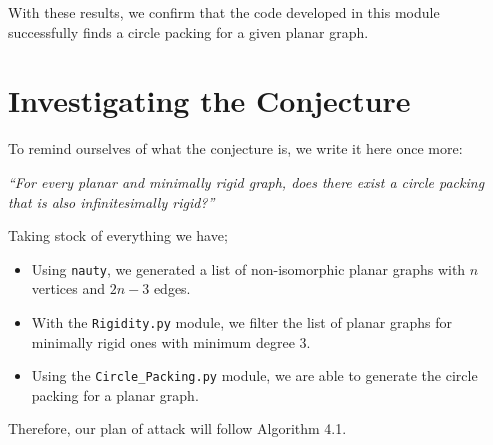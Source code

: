 \begin{flushleft}
With these results, we confirm that the code developed in this module successfully finds a circle packing for a given planar graph.
\end{flushleft}

\section{Investigating the Conjecture}

\begin{flushleft}
To remind ourselves of what the conjecture is, we write it here once more:

\begin{center}
    \textit{``For every planar and minimally rigid graph, does there exist a circle packing that is also infinitesimally rigid?''}
\end{center}

Taking stock of everything we have;
\begin{itemize}
    \item Using \texttt{nauty}, we generated a list of non-isomorphic planar graphs with $n$ vertices and $2n-3$ edges.
    \vspace{-3mm}
    \item With the \texttt{Rigidity.py} module, we filter the list of planar graphs for minimally rigid ones with minimum degree 3.
    \vspace{-3mm}
    \item Using the \texttt{Circle\_Packing.py} module, we are able to generate the circle packing for a planar graph.
\end{itemize}

Therefore, our plan of attack will follow Algorithm 4.1.
\end{flushleft}
